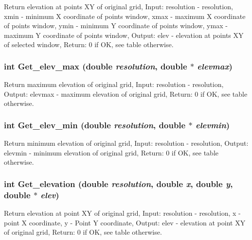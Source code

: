 Return elevation at points XY of original grid, Input: resolution - resolution, xmin - minimum X coordinate of points window, xmax - maximum X coordinate of points window, ymin - minimum Y coordinate of points window, ymax - maximum Y coordinate of points window, Output: elev - elevation at points XY of selected window, Return: 0 if OK, see table otherwise. 

\hypertarget{GisApi_8C_a54}{
\subsubsection[Get\_\-elev\_\-max]{\setlength{\rightskip}{0pt plus 5cm}int Get\_\-elev\_\-max (double {\em resolution}, double $\ast$ {\em elevmax})}}
\label{GisApi_8C_a54}


Return maximum elevation of original grid, Input: resolution - resolution, Output: elevmax - maximum elevation of original grid, Return: 0 if OK, see table otherwise. 

\hypertarget{GisApi_8C_a53}{
\subsubsection[Get\_\-elev\_\-min]{\setlength{\rightskip}{0pt plus 5cm}int Get\_\-elev\_\-min (double {\em resolution}, double $\ast$ {\em elevmin})}}
\label{GisApi_8C_a53}


Return minimum elevation of original grid, Input: resolution - resolution, Output: elevmin - minimum elevation of original grid, Return: 0 if OK, see table otherwise. 

\hypertarget{GisApi_8C_a70}{
\subsubsection[Get\_\-elevation]{\setlength{\rightskip}{0pt plus 5cm}int Get\_\-elevation (double {\em resolution}, double {\em x}, double {\em y}, double $\ast$ {\em elev})}}
\label{GisApi_8C_a70}


Return elevation at point XY of original grid, Input: resolution - resolution, x - point X coordinate, y - Point Y coordinate, Output: elev - elevation at point XY of original grid, Return: 0 if OK, see table otherwise. 

